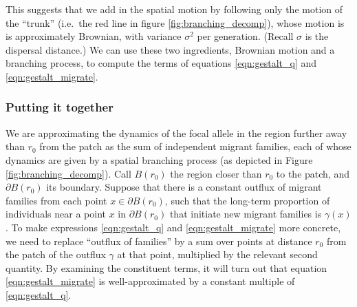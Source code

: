 \documentclass{article}
\begin{document}
This suggests that we add in the spatial motion by following only the motion of the ``trunk''
(i.e.\ the red line in figure \ref{fig:branching_decomp}),
whose motion is is approximately Brownian, with variance $\sigma^2$ per generation.
(Recall $\sigma$ is the dispersal distance.)
We can use these two ingredients, Brownian motion and a branching process, 
to compute the terms of equations \eqref{eqn:gestalt_q} and \eqref{eqn:gestalt_migrate}.


\subsubsection*{Putting it together}

We are approximating the dynamics of the focal allele in the region further away than $r_0$ from the patch
as the sum of independent migrant families, each of whose dynamics are
given by a spatial branching process (as depicted in Figure \ref{fig:branching_decomp}).
Call $B(r_0)$ the region closer than $r_0$ to the patch, and $\partial B(r_0)$ its boundary.
Suppose that there is a constant outflux of migrant families from each point $x \in \partial B(r_0)$,
such that the long-term proportion of individuals near a point $x$ in $\partial B(r_0)$ that initiate new migrant families
is $\gamma(x)$.
To make expressions \eqref{eqn:gestalt_q} and \eqref{eqn:gestalt_migrate} more concrete,
we need to replace ``outflux of families'' by a sum over points at distance $r_0$ from the patch
of the outflux $\gamma$ at that point, multiplied by the relevant second quantity.
By examining the constituent terms,
it will turn out that equation \eqref{eqn:gestalt_migrate} 
is well-approximated by a constant multiple of \eqref{eqn:gestalt_q}.
\end{document}
